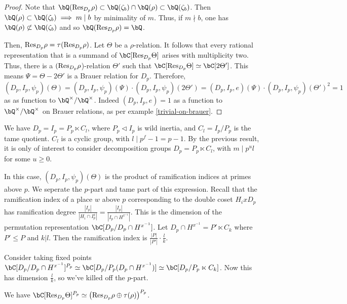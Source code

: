 \begin{proof}
    Note that $\bQ(\Res_{D_p}{\rho}) \subset \bQ(\zeta_b) \cap \bQ(\rho) \subset \bQ(\zeta_b)$. Then $\bQ(\rho) \subset \bQ(\zeta_b) \implies m \mid b$ by minimality of $m$. Thus, if $m \nmid b$, one has $\bQ(\rho) \not\subset \bQ(\zeta_b)$ and so $\bQ(\Res_{D_p} \rho) = \bQ$. 

    Then, $\mathrm{Res}_{D_p} \rho = \tau (\mathrm{Res}_{D_p} \rho)$. Let $\Theta$ be a $\rho$-relation. It follows that every rational representation that is a summand of $\bC[\Res_{D_p} \Theta]$ arises with multiplicity two. 
    Thus, there is a $(\mathrm{Res}_{D_p}\rho$)-relation $\Theta ' $ such that $\bC[\Res_{D_p} \Theta] \simeq \bC[2 \Theta']$. This means $\Psi = \Theta - 2 \Theta'$ is a Brauer relation for $D_p$. Therefore, $(D_p, I_p, \psi_p)(\Theta) = (D_p, I_p, \psi_p)(\Psi) \cdot (D_p, I_p, \psi_p)(2 \Theta') = (D_p, I_p, e)(\Psi)  \cdot (D_p, I_p, \psi_p)(\Theta')^2 = 1$ as as function to $\bQ^{\times} / \bQ^{\times}$. Indeed $(D_p, I_p, e) = 1$ as a function to $\bQ^{\times} / \bQ^{\times}$ on Brauer relations, as per example \ref{trivial-on-brauer}.
\end{proof}

We have $D_p = I_p = P_p \ltimes C_l$, where $P_p \triangleleft I_p$ is wild inertia, and $C_l = I_p / P_p$ is the tame quotient. $C_l$ is a cyclic group, with $l \mid p^f - 1 = p - 1$. By the previous result, it is only of interest to consider decomposition groups $D_p = P_p \ltimes C_l$, with $m \mid p^u l$ for some $u \geq 0$. 

In this case, $(D_p, I_p, \psi_p)(\Theta)$ is the product of ramification indices at primes above $p$. We seperate the $p$-part and tame part of this expression.
Recall that the ramification index of a place $w$ above $p$ corresponding to the double coset $H_i x D_p$ has ramification degree $\frac{|I_p|}{|H_i \cap I_p^x|} =\frac{|I_p|}{|I_p \cap H^{x^{-1}}|}$.
This is the dimension of the permutation representation $\bC[D_p / D_p \cap H^{x^{-1}}]$.
Let  $D_p \cap H^{x^{-1}} = P' \ltimes C_k$ where $P' \leq P$ and $k | l$. Then the ramification index is $\frac{|P|}{|P'|}\cdot \frac{l}{k}$. 


Consider taking fixed points $\bC[D_p / D_p \cap H^{x^{-1}}]^{P_p} \simeq \bC[D_p / P_p (D_p \cap H^{x^{-1}})] \simeq \bC[D_p / P_p \ltimes C_k]$. Now this has dimension $\frac{l}{k}$, so we've killed off the $p$-part. 

We have $\bC[\Res_{D_p} \Theta]^{P_p} \simeq \left(\Res_{D_p} \rho \oplus \tau(\rho)\right)^{P_p}$. 




